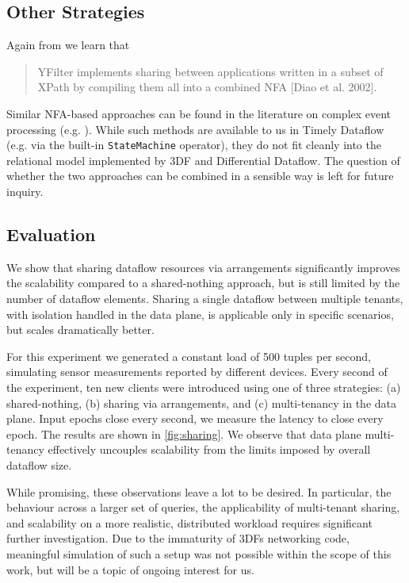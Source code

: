 \documentclass[../catalog.tex]{subfiles}
\begin{document}
\subsection{Other Strategies}

Again from \cite{hirzel2014catalog} we learn that

\begin{quote}
YFilter implements sharing between applications written in a subset of
XPath by compiling them all into a combined NFA [Diao et al. 2002].
\end{quote}

Similar NFA-based approaches can be found in the literature on complex
event processing (e.g. \cite{agrawal2008}). While such methods are
available to us in Timely Dataflow (e.g. via the built-in
\texttt{StateMachine} operator), they do not fit cleanly into the
relational model implemented by 3DF and Differential Dataflow. The
question of whether the two approaches can be combined in a sensible
way is left for future inquiry.

\subsection{Evaluation}

We show that sharing dataflow resources via arrangements significantly
improves the scalability compared to a shared-nothing approach, but is
still limited by the number of dataflow elements. Sharing a single
dataflow between multiple tenants, with isolation handled in the data
plane, is applicable only in specific scenarios, but scales
dramatically better.

For this experiment we generated a constant load of 500 tuples per
second, simulating sensor measurements reported by different
devices. Every second of the experiment, ten new clients were
introduced using one of three strategies: (a) shared-nothing, (b)
sharing via arrangements, and (c) multi-tenancy in the data plane.
Input epochs close every second, we measure the latency to close every
epoch. The results are shown in \autoref{fig:sharing}. We observe that
data plane multi-tenancy effectively uncouples scalability from the
limits imposed by overall dataflow size.

While promising, these observations leave a lot to be desired. In
particular, the behaviour across a larger set of queries, the
applicability of multi-tenant sharing, and scalability on a more
realistic, distributed workload requires significant further
investigation. Due to the immaturity of 3DFs networking code,
meaningful simulation of such a setup was not possible within the
scope of this work, but will be a topic of ongoing interest for us.
\end{document}
